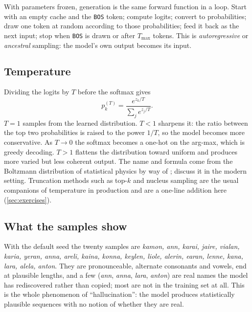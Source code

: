 \documentclass[11pt,letterpaper]{article}
\theoremstyle{remark}
\newcommand{\BOS}{\texttt{BOS}}
\begin{document}
With parameters frozen, generation is the same forward function in a loop. Start with an empty cache and the \BOS{} token; compute logits; convert to probabilities; draw one token at random according to those probabilities; feed it back as the next input; stop when \BOS{} is drawn or after $T_{\max}$ tokens. This is \emph{autoregressive} or \emph{ancestral} sampling: the model's own output becomes its input.

\subsection{Temperature}

Dividing the logits by $T$ before the softmax gives
\begin{equation}
p_k^{(T)} = \frac{e^{z_k/T}}{\sum_j e^{z_j/T}}.
\end{equation}
$T=1$ samples from the learned distribution. $T<1$ sharpens it: the ratio between the top two probabilities is raised to the power $1/T$, so the model becomes more conservative. As $T\to 0$ the softmax becomes a one-hot on the arg-max, which is greedy decoding. $T>1$ flattens the distribution toward uniform and produces more varied but less coherent output. The name and formula come from the Boltzmann distribution of statistical physics by way of \textcite{ackley1985boltzmann}; \textcite{hinton2015distilling} discuss it in the modern setting. Truncation methods such as top-$k$ \parencite{fan2018hierarchical} and nucleus sampling \parencite{holtzman2020nucleus} are the usual companions of temperature in production and are a one-line addition here (\cref{sec:exercises}).

\subsection{What the samples show}

With the default seed the twenty samples are \emph{kamon, ann, karai, jaire, vialan, karia, yeran, anna, areli, kaina, konna, keylen, liole, alerin, earan, lenne, kana, lara, alela, anton}. They are pronounceable, alternate consonants and vowels, end at plausible lengths, and a few (\emph{ann}, \emph{anna}, \emph{lara}, \emph{anton}) are real names the model has rediscovered rather than copied; most are not in the training set at all. This is the whole phenomenon of ``hallucination'': the model produces statistically plausible sequences with no notion of whether they are real.

\end{document}

